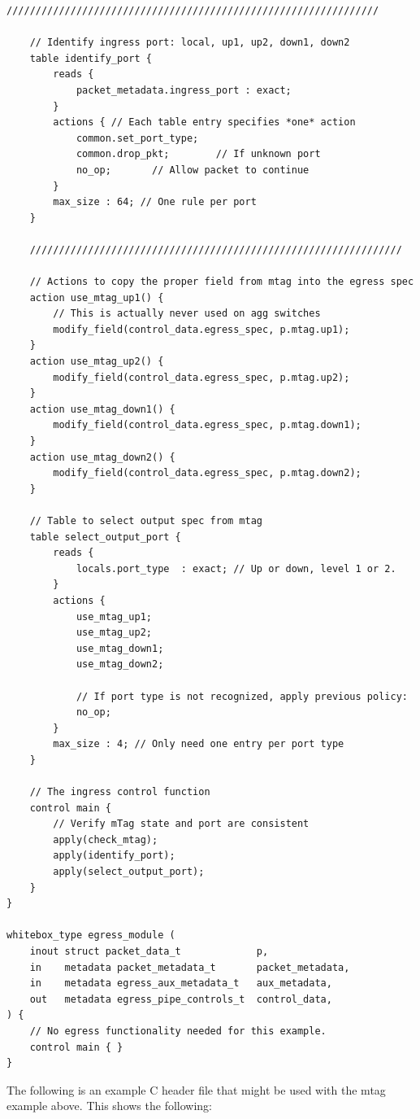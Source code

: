 \documentclass[12pt]{article}
\begin{document}
\begin{lstlisting}[style=P4style]
    ////////////////////////////////////////////////////////////////

    // Identify ingress port: local, up1, up2, down1, down2
    table identify_port {
        reads {
            packet_metadata.ingress_port : exact;
        }
        actions { // Each table entry specifies *one* action
            common.set_port_type;
            common.drop_pkt;        // If unknown port
            no_op;       // Allow packet to continue
        }
        max_size : 64; // One rule per port
    }

    ////////////////////////////////////////////////////////////////

    // Actions to copy the proper field from mtag into the egress spec
    action use_mtag_up1() {
        // This is actually never used on agg switches
        modify_field(control_data.egress_spec, p.mtag.up1);
    }
    action use_mtag_up2() {
        modify_field(control_data.egress_spec, p.mtag.up2);
    }
    action use_mtag_down1() {
        modify_field(control_data.egress_spec, p.mtag.down1);
    }
    action use_mtag_down2() {
        modify_field(control_data.egress_spec, p.mtag.down2);
    }

    // Table to select output spec from mtag
    table select_output_port {
        reads {
            locals.port_type  : exact; // Up or down, level 1 or 2.
        }
        actions {
            use_mtag_up1;
            use_mtag_up2;
            use_mtag_down1;
            use_mtag_down2;

            // If port type is not recognized, apply previous policy:
            no_op; 
        }
        max_size : 4; // Only need one entry per port type
    }

    // The ingress control function
    control main {
        // Verify mTag state and port are consistent
        apply(check_mtag);
        apply(identify_port);
        apply(select_output_port);
    }
}

whitebox_type egress_module (
    inout struct packet_data_t             p,
    in    metadata packet_metadata_t       packet_metadata,
    in    metadata egress_aux_metadata_t   aux_metadata,
    out   metadata egress_pipe_controls_t  control_data,
) {
    // No egress functionality needed for this example.
    control main { }
}
\end{lstlisting}

The following is an example C header file that might be used with the mtag
example above. This shows the following:
\end{document}
